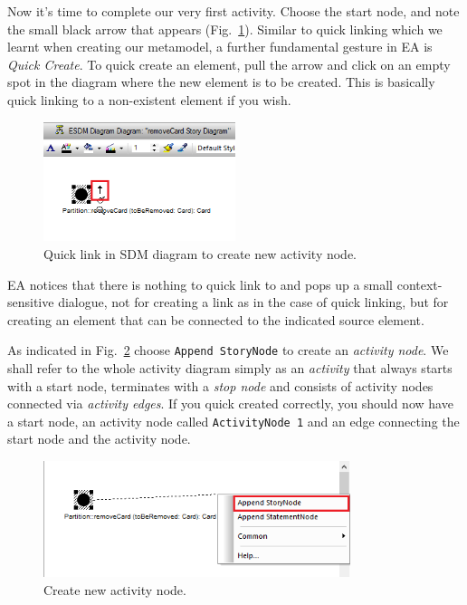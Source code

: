 Now it's time to complete our very first activity. 
Choose the start node, and note the small black arrow that appears (Fig.~\ref{fig:sdm_quicklink}).  
Similar to quick linking which we learnt when creating our metamodel, a further fundamental gesture in EA is \emph{Quick
Create}. 
To quick create an element, pull the arrow and click on an empty spot in the diagram where the new element is to be created.  
This is basically quick linking to a non-existent element if you wish.

\begin{figure}[htp]
\begin{center}
  \includegraphics[width=0.5\textwidth]{pics/sdmBilder/removeCard/sdm03RAW}
  \caption{Quick link in SDM diagram to create new activity node.}  
  \label{fig:sdm_quicklink}
\end{center}
\end{figure}

EA notices that there is nothing to quick link to and pops up a small context-sensitive dialogue, not for creating a link as in the case of quick linking, but for creating an element that can be connected to the indicated source element. 

As indicated in Fig.~\ref{fig:sdm_new_activity_node} choose \texttt{Append StoryNode} to create an \emph{activity node}.  
We
shall refer to the whole activity diagram simply as an \emph{activity} that always starts with a start node, terminates with a \emph{stop node} and consists of activity nodes connected via \emph{activity edges}.  
If you quick created correctly, you should now have a start node, an activity node called \texttt{ActivityNode 1} and an edge connecting the start node and the activity node.

\begin{figure}[htp]
\begin{center}
  \includegraphics[width=0.8\textwidth]{pics/sdmBilder/removeCard/sdm04RAW}
  \caption{Create new activity node.}  
  \label{fig:sdm_new_activity_node}
\end{center}
\end{figure}

